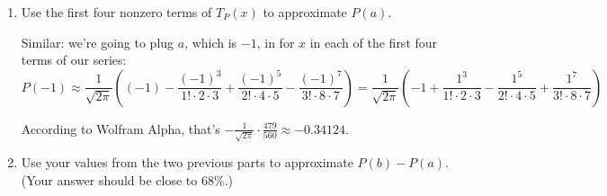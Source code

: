 \begin{enumerate}[leftmargin=0pt]
    \begin{red}
    So we're going to plug $b$, which is $1$, in for $x$ in each of the first four terms of our series (the ones that come from $k=0, 1, 2, 3$):
    
    \[P(1) \approx \frac{1}{\sqrt{2\pi}} \left(1 - \frac{1^3}{1! \cdot 2\cdot 3} + \frac{1^5}{2!\cdot 4\cdot 5} - \frac{1^7}{3!\cdot 8 \cdot 7}\right)\]
    
    According to Wolfram Alpha, that's $\frac{1}{\sqrt{2\pi}}\cdot  \frac{479}{560} \approx 0.34124$.
    
    (Notice, btw, that this is \textit{not} the fourth-degree polynomial -- it's the 7th-degree polynomial. This is actually good because higher powers of $x$ are probably going to give us better approximations, so it's nice when they come earlier in the series than we would otherwise think.)
    \end{red}
    \item Use the first four nonzero terms of $T_P(x)$ to approximate $P(a)$.
    
    \begin{red}
    Similar: we're going to plug $a$, which is $-1$, in for $x$ in each of the first four terms of our series:
    \[P(-1) \approx \frac{1}{\sqrt{2\pi}} \left((-1) - \frac{(-1)^3}{1! \cdot 2\cdot 3} + \frac{(-1)^5}{2!\cdot 4\cdot 5} - \frac{(-1)^7}{3!\cdot 8 \cdot 7} \right) = \frac{1}{\sqrt{2\pi}} \left(-1 + \frac{1^3}{1! \cdot 2\cdot 3} - \frac{1^5}{2!\cdot 4\cdot 5} + \frac{1^7}{3!\cdot 8 \cdot 7}\right) \]
    
    According to Wolfram Alpha, that's $-\frac{1}{\sqrt{2\pi}}\cdot  \frac{479}{560} \approx -0.34124$.
    \end{red}
    \item Use your values from the two previous parts to approximate $P(b) - P(a)$. \\ (Your answer should be close to 68\%.)
    

\end{enumerate}

